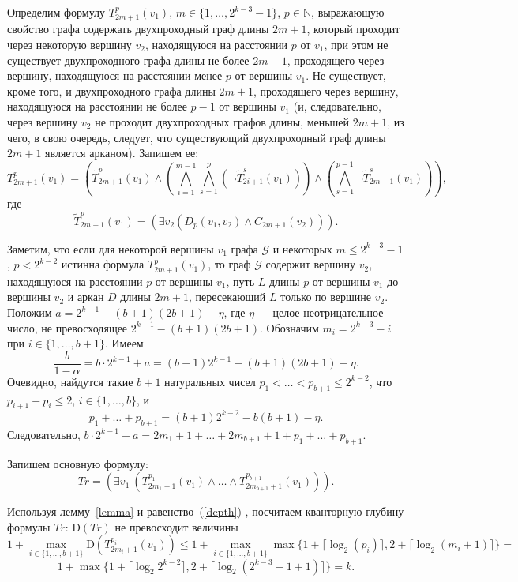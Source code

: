 \documentclass[12pt,a4paper,russian,titlepage]{article}
\begin{document}
Определим формулу $T_{2m+1}^{p}(v_1)$, $m\in\{1,\ldots,2^{k-3}-1\}$, $p\in\mathbb{N}$, выражающую свойство графа содержать двухпроходный граф длины $2m+1$, который проходит через некоторую вершину $v_2$, находящуюся на расстоянии $p$ от $v_1$, при этом не существует двухпроходного графа длины не более $2m-1$, проходящего через вершину, находящуюся на расстоянии менее $p$ от вершины $v_1$. Не существует, кроме того, и двухпроходного графа длины $2m+1$, проходящего через вершину, находящуюся на расстоянии не более $p-1$ от вершины $v_1$ (и, следовательно, через вершину $v_2$ не проходит двухпроходных графов длины, меньшей $2m+1$, из чего, в свою очередь, следует, что существующий двухпроходный граф длины $2m+1$ является арканом). Запишем ее:
$$
 T_{2m+1}^{p} (v_1) = \left(\tilde T_{2m+1}^{p}(v_1) \wedge \left( \bigwedge_{i = 1}^{m-1}\bigwedge_{s=1}^{p} \left(\neg\tilde T_{2i+1}^{s}(v_1)\right)\right)\wedge\left(\bigwedge_{s=1}^{p-1} \neg\tilde T_{2m+1}^{s}(v_1)\right)\right),
$$
где
$$
 \tilde T_{2m+1}^{p}(v_1) = \left(\exists v_2 \left( D_{p}(v_1,v_2) \wedge C_{2m+1}(v_2)\right)\right).
$$

Заметим, что если для некоторой вершины $v_1$ графа $\mathcal{G}$ и некоторых $m\leq 2^{k-3}-1$, $p< 2^{k-2}$ истинна формула $T_{2m+1}^{p}(v_1)$, то граф $\mathcal{G}$ содержит вершину $v_2$, находящуюся на расстоянии $p$ от вершины $v_1$, путь $L$ длины $p$ от вершины $v_1$ до вершины $v_2$ и аркан $D$ длины $2m+1$, пересекающий $L$ только по вершине $v_2$.\\


Положим $a=2^{k-1}-(b+1)(2b+1)-\eta$, где $\eta$ --- целое неотрицательное число, не превосходящее $2^{k-1}-(b+1)(2b+1)$. Обозначим $m_i=2^{k-3}-i$ при $i\in\{1,\ldots,b+1\}$. Имеем
$$
 \frac{b}{1-\alpha}=b\cdot 2^{k-1}+a=(b+1)2^{k-1}-(b+1)(2b+1)-\eta.
$$ 
Очевидно, найдутся такие $b+1$ натуральных чисел $p_1<\ldots<p_{b+1}\leq 2^{k-2}$, что $p_{i+1}-p_i\leq 2$, $i\in\{1,\ldots,b\}$, и
$$
 p_1+\ldots+p_{b+1}=(b+1)2^{k-2}-b(b+1)-\eta.
$$
Следовательно, $b\cdot 2^{k-1}+a=2m_1+1+\ldots+2m_{b+1}+1+p_1+\ldots+p_{b+1}$.

Запишем основную формулу:
$$
 Tr = \left( \exists v_1\ \left(T_{2m_1+1}^{p_1}(v_1)\wedge \ldots \wedge T_{2m_{b+1}+1}^{p_{b+1}}(v_1)\right)\right ).
$$

Используя лемму~\ref{lemma} и равенство~(\ref{depth}) , посчитаем кванторную глубину формулы $Tr$: $\mathrm{D}(Tr)$ не превосходит величины
$$
 1 +\max_{i\in\{1,\ldots,b+1\}}\mathrm{D}\left(T_{2m_i+1}^{p_i}(v_1)\right)\leq
 1+\max_{i\in\{1,\ldots,b+1\}}\max\{1+\lceil\log_2(p_i)\rceil,2+\lceil\log_2(m_i+1)\rceil \}=
$$ 
$$ 
 1+\max\{1+\lceil\log_2 2^{k-2}\rceil,2+\lceil\log_2(2^{k-3}-1+1)\rceil \}=k.
$$
\end{document}

